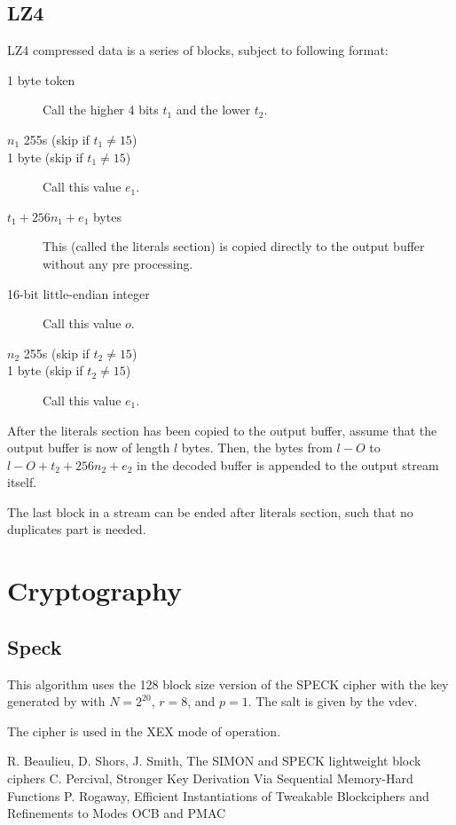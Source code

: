 \documentclass[11pt,a4paper]{report}
\begin{document}
        \subsection{LZ4}
        \label{algorithm:lz4}
        LZ4 compressed data is a series of blocks, subject to following format:

        \begin{description}
            \item [1 byte token] Call the higher 4 bits $t_1$ and the lower
                $t_2$.
            \item [$n_1$ 255s (skip if $t_1 \neq 15$)]
            \item [1 byte (skip if $t_1 \neq 15$)] Call this value $e_1$.
            \item [$t_1 + 256n_1 + e_1$ bytes] This (called the literals
                section) is copied directly to the output buffer without any
                pre processing.
            \item [16-bit little-endian integer] Call this value $o$.
            \item [$n_2$ 255s (skip if $t_2 \neq 15$)]
            \item [1 byte (skip if $t_2 \neq 15$)] Call this value $e_1$.
        \end{description}

        After the literals section has been copied to the output buffer, assume
        that the output buffer is now of length $l$ bytes. Then, the bytes from
        $l - O$ to $l - O + t_2 + 256n_2 + e_2$ in the decoded buffer is
        appended to the output stream itself.

        The last block in a stream can be ended after literals section, such
        that no duplicates part is needed.

    \section{Cryptography}
        \subsection{Speck}
        \label{algorithm:speck}
        This algorithm uses the 128 block size version of the SPECK
        cipher\cite{speck} with the key generated by \cite{scrypt} with $N =
        2^{20}$, $r = 8$, and $p = 1$. The salt is given by the vdev.

        The cipher is used in the XEX mode of operation\cite{xex}.

    \begin{thebibliography}{9}
        R. Beaulieu, D. Shors, J. Smith, The SIMON and SPECK lightweight block ciphers
        C. Percival, Stronger Key Derivation Via Sequential Memory-Hard Functions
        P. Rogaway, Efficient Instantiations of Tweakable Blockciphers and Refinements to Modes OCB and PMAC
    \end{thebibliography}
\end{document}
